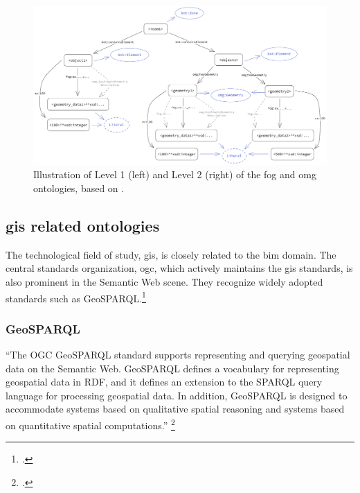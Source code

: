 \begin{figure}[H]
    \begin{adjustwidth}{-0.8cm}{-0.8cm}
        \centering
        \ttfamily
        \includegraphics[width=1.1\textwidth]{figures/pdf/fog-omg.pdf}
        \caption[Illustration of the \acs{fog} and \acs{omg} ontologies]{Illustration of Level 1 (left) and Level 2 (right) of the \acs{fog} and \acs{omg} ontologies, based on \cite{Bonduel2019}.}
        \label{fig:fogGom}
    \end{adjustwidth}
\end{figure}

\subsection{\acs{gis} related ontologies}
The technological field of study, \acf{gis}, is closely related to the \ac{bim} domain. The central standards organization, \ac{ogc}, which actively maintains the \ac{gis} standards, is also prominent in the Semantic Web scene. They recognize widely adopted standards such as GeoSPARQL.\footcite{OGC2023SW}

\subsubsection{GeoSPARQL}
\enquote{The OGC GeoSPARQL standard supports representing and querying geospatial data on the Semantic Web. GeoSPARQL defines a vocabulary for representing geospatial data in RDF, and it defines an extension to the SPARQL query language for processing geospatial data. In addition, GeoSPARQL is designed to accommodate systems based on qualitative spatial reasoning and systems based on quantitative spatial computations.} \footcite{OGC2023}

